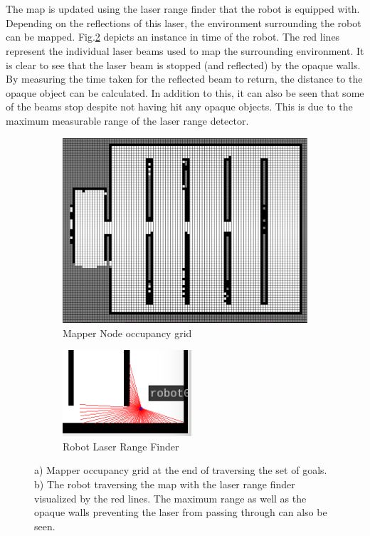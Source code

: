 \documentclass[a4paper,12pt]{article}
\begin{document}
			\\
			\\
			The map is updated using the laser range finder that the robot is equipped with. Depending on the reflections of this laser, the environment surrounding the robot can be mapped. Fig.\ref{robotLaserRange} depicts an instance in time of the robot. The red lines represent the individual laser beams used to map the surrounding environment. It is clear to see that the laser beam is stopped (and reflected) by the opaque walls. By measuring the time taken for the reflected beam to return, the distance to the opaque object can be calculated. In addition to this, it can also be seen that some of the beams stop despite not having hit any opaque objects. This is due to the maximum measurable range of the laser range detector. 

			\begin{figure}[H]
				\centering
				\begin{subfigure}{.5\textwidth}
					\centering
					\includegraphics[width=.7\linewidth]{images/mapperNodeOccupancyGrid.png}
					\caption{Mapper Node occupancy grid}
					\label{mapperNodeOccupancyGrid}
				\end{subfigure}
				\begin{subfigure}{.5\textwidth}
					\centering
					\includegraphics[width=.7\linewidth]{images/robotLaserRange.png}
					\caption{Robot Laser Range Finder}
					\label{robotLaserRange}
				\end{subfigure}
				\caption{a) Mapper occupancy grid at the end of traversing the set of goals. b) The robot traversing the map with the laser range finder visualized by the red lines. The maximum range as well as the opaque walls preventing the laser from passing through can also be seen.}
				\label{ReactivePlannerFigs}
			\end{figure}
\end{document}
